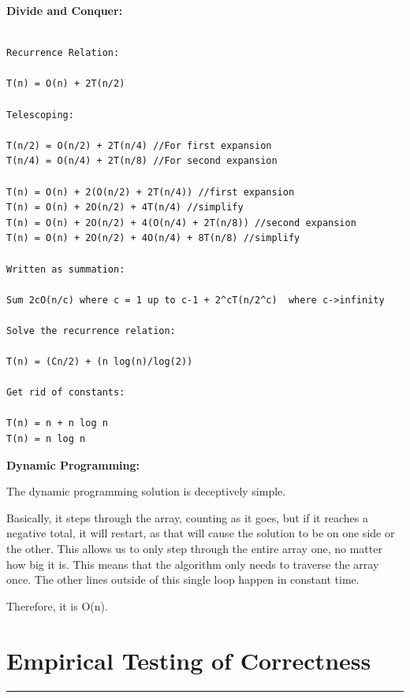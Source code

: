 \documentclass[letterpaper,10pt,titlepage,fleqn]{article}
\begin{document}
\begin{centering}
\textbf{Divide and Conquer:}
\end{centering}


\begin{lstlisting}

Recurrence Relation:

T(n) = O(n) + 2T(n/2)

Telescoping:

T(n/2) = O(n/2) + 2T(n/4) //For first expansion
T(n/4) = O(n/4) + 2T(n/8) //For second expansion

T(n) = O(n) + 2(O(n/2) + 2T(n/4)) //first expansion
T(n) = O(n) + 2O(n/2) + 4T(n/4) //simplify
T(n) = O(n) + 2O(n/2) + 4(O(n/4) + 2T(n/8)) //second expansion
T(n) = O(n) + 2O(n/2) + 4O(n/4) + 8T(n/8) //simplify

Written as summation:

Sum 2cO(n/c) where c = 1 up to c-1 + 2^cT(n/2^c)  where c->infinity

Solve the recurrence relation:

T(n) = (Cn/2) + (n log(n)/log(2))

Get rid of constants:

T(n) = n + n log n
T(n) = n log n

\end{lstlisting}

\begin{centering}
\textbf{Dynamic Programming:}
\end{centering}


The dynamic programming solution is deceptively simple.

Basically, it steps through the array, counting as it goes, but if it reaches a negative total, it will restart, as that will cause the solution to be on one side or the other.
This allows us to only step through the entire array one, no matter how big it is. This means that the algorithm only needs to traverse the array once. The other lines outside of this single loop happen in constant time. 

Therefore, it is O(n).

\section*{Empirical Testing of Correctness}
\hrule
\end{document}
